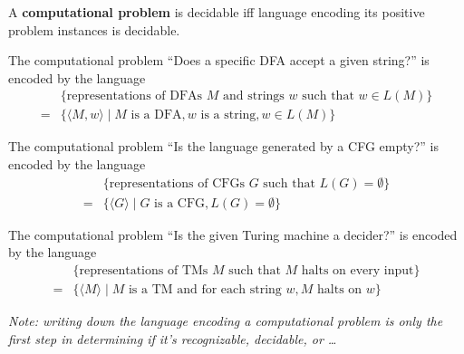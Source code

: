 A {\bf computational problem} is decidable iff language encoding its positive problem instances
is decidable.

The computational problem ``Does a specific DFA accept a given string?'' is encoded by the language
\begin{align*}
  &\{ \textrm{representations of DFAs $M$ and strings $w$ such that $w \in L(M)$}\}  \\
  =& \{ \langle M, w \rangle \mid M \textrm{ is a DFA}, w \textrm{ is a string}, w \in L(M) \}
\end{align*}

The computational problem ``Is the language generated by a CFG empty?'' is encoded by the language
\begin{align*}
  &\{ \textrm{representations of CFGs $G$  such that $L(G) = \emptyset$}\}  \\
  =& \{ \langle G \rangle \mid G \textrm{ is a CFG},  L(G) = \emptyset \}
\end{align*}



The computational problem ``Is the given Turing machine a decider?'' is encoded by the language
\begin{align*}
  &\{ \textrm{representations of TMs $M$  such that $M$ halts on every input}\}  \\
  =& \{ \langle M \rangle \mid M \textrm{ is a TM and for each string } w, \textrm{$M$ halts on $w$} \}
\end{align*}


{\it Note: writing down the language encoding a computational problem is only the first step in 
determining if it's recognizable, decidable, or \ldots }
